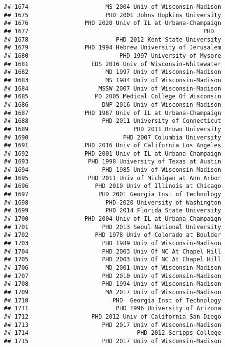 \documentclass[
]{article}
\begin{document}
\begin{verbatim}
## 1674                      MS 2004 Univ of Wisconsin-Madison
## 1675                      PHD 2001 Johns Hopkins University
## 1676                PHD 2020 Univ of IL at Urbana-Champaign
## 1677                                                  PHD  
## 1678                         PHD 2012 Kent State University
## 1679                PHD 1994 Hebrew University of Jerusalem
## 1680                          PHD 1997 University of Mysore
## 1681                  EDS 2016 Univ of Wisconsin-Whitewater
## 1682                      MD 1997 Univ of Wisconsin-Madison
## 1683                      MS 1984 Univ of Wisconsin-Madison
## 1684                    MSSW 2007 Univ of Wisconsin-Madison
## 1685                   MD 2005 Medical College Of Wisconsin
## 1686                     DNP 2016 Univ of Wisconsin-Madison
## 1687                PHD 1987 Univ of IL at Urbana-Champaign
## 1688                     PHD 2011 University of Connecticut
## 1689                              PHD 2011 Brown University
## 1690                           PHD 2007 Columbia University
## 1691                PHD 2016 Univ of California Los Angeles
## 1692                PHD 2001 Univ of IL at Urbana-Champaign
## 1693                 PHD 1998 University of Texas at Austin
## 1694                     PHD 1985 Univ of Wisconsin-Madison
## 1695                 PHD 2011 Univ of Michigan at Ann Arbor
## 1696                   PHD 2010 Univ of Illinois at Chicago
## 1697                    PHD 2001 Georgia Inst of Technology
## 1698                      PHD 2020 University of Washington
## 1699                      PHD 2014 Florida State University
## 1700                PHD 2004 Univ of IL at Urbana-Champaign
## 1701                     PHD 2013 Seoul National University
## 1702                   PHD 1978 Univ of Colorado at Boulder
## 1703                     PHD 1989 Univ of Wisconsin-Madison
## 1704                     PHD 2003 Univ Of NC At Chapel Hill
## 1705                     PHD 2003 Univ Of NC At Chapel Hill
## 1706                      MD 2001 Univ of Wisconsin-Madison
## 1707                     PHD 2010 Univ of Wisconsin-Madison
## 1708                     PHD 1994 Univ of Wisconsin-Madison
## 1709                      MA 2017 Univ of Wisconsin-Madison
## 1710                        PHD  Georgia Inst of Technology
## 1711                         PHD 1996 University of Arizona
## 1712                  PHD 2012 Univ of California San Diego
## 1713                     PHD 2017 Univ of Wisconsin-Madison
## 1714                               PHD 2012 Scripps College
## 1715                     PHD 2017 Univ of Wisconsin-Madison

\end{verbatim}
\end{document}
